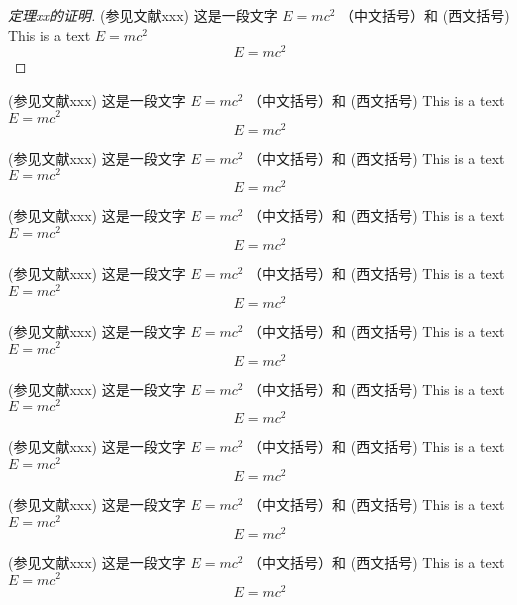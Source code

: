 \begin{proof}[定理xx的证明]
  (参见文献xxx) 这是一段文字 $E = m c^2$  （中文括号）和 (西文括号) 
  This is a text $E = m c^2$
  \[
    E = m c^2
  \]
\end{proof}

\begin{example}
  (参见文献xxx) 这是一段文字 $E = m c^2$  （中文括号）和 (西文括号) 
  This is a text $E = m c^2$
  \[
    E = m c^2
  \]
\end{example}

\begin{example}[测度 measure]
  (参见文献xxx) 这是一段文字 $E = m c^2$  （中文括号）和 (西文括号) 
  This is a text $E = m c^2$
  \[
    E = m c^2
  \]
\end{example}

\begin{property}
  (参见文献xxx) 这是一段文字 $E = m c^2$  （中文括号）和 (西文括号) 
  This is a text $E = m c^2$
  \[
    E = m c^2
  \]
\end{property}

\begin{property}[测度 measure]
  (参见文献xxx) 这是一段文字 $E = m c^2$  （中文括号）和 (西文括号) 
  This is a text $E = m c^2$
  \[
    E = m c^2
  \]
\end{property}

\begin{proposition}
  (参见文献xxx) 这是一段文字 $E = m c^2$  （中文括号）和 (西文括号) 
  This is a text $E = m c^2$
  \[
    E = m c^2
  \]
\end{proposition}

\begin{proposition}[测度 measure]
  (参见文献xxx) 这是一段文字 $E = m c^2$  （中文括号）和 (西文括号) 
  This is a text $E = m c^2$
  \[
    E = m c^2
  \]
\end{proposition}

\begin{corollary}
  (参见文献xxx) 这是一段文字 $E = m c^2$  （中文括号）和 (西文括号) 
  This is a text $E = m c^2$
  \[
    E = m c^2
  \]
\end{corollary}

\begin{corollary}[测度 measure]
  (参见文献xxx) 这是一段文字 $E = m c^2$  （中文括号）和 (西文括号) 
  This is a text $E = m c^2$
  \[
    E = m c^2
  \]
\end{corollary}

\begin{lemma}
  (参见文献xxx) 这是一段文字 $E = m c^2$  （中文括号）和 (西文括号) 
  This is a text $E = m c^2$
  \[
    E = m c^2
  \]
\end{lemma}

